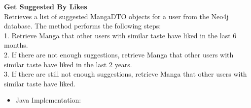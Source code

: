 \textbf{Get Suggested By Likes}\\
Retrieves a list of suggested MangaDTO objects for a user from the Neo4j database.
The method performs the following steps:\\
1. Retrieve Manga that other users with similar taste have liked in the last 6 months.\\
2. If there are not enough suggestions, retrieve Manga that other users with similar taste have liked in the last 2 years.\\
3. If there are still not enough suggestions, retrieve Manga that other users with similar taste have liked.\\
\begin{itemize}
    \item Java Implementation:
\end{itemize}

